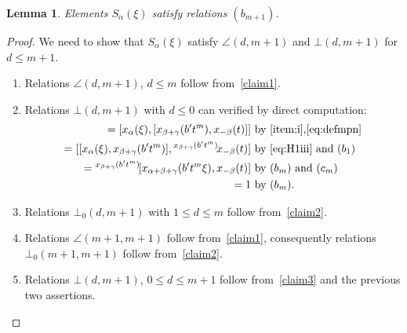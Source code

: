 \documentclass[oneside, 10pt]{amsart}
\newcommand{\rA}{\mathsf{A}}
\numberwithin{equation}{section}
\newtheorem{lemma}{Lemma}
\numberwithin{lemma}{section}
\theoremstyle{definition}
\theoremstyle{remark}
\begin{document}
\begin{lemma}
Elements $S_\alpha(\xi)$ satisfy relations $(b_{m+1})$.
 \end{lemma}
\begin{proof}
We need to show that $S_\alpha(\xi)$ satisfy $\angle(d, m+1)$ and $\bot(d, m+1)$ for $d\leq m+1$.
\begin{enumerate}
 \item Relations $\angle(d, m+1)$, $d\leq m$ follow from~\cref{claim1}. 
 \item Relations $\bot(d, m+1)$ with $d\leq 0$ can verified by direct computation:
 \begin{align*} 
 [x_\alpha(\xi), S_{\gamma}(bt^{m+1})] = [x_\alpha(\xi), [x_{\beta+\gamma}(b't^m), x_{-\beta}(t)]] & \text{ by~\eqref{item:i},\eqref{eq:defmpn}} \\
 = [[x_\alpha(\xi), x_{\beta+\gamma}(b't^m)], {}^{x_{\beta+\gamma}(b't^m)}\!x_{-\beta}(t)] &
 \text{ by \eqref{eq:H1iii} and $(b_1)$} \\
 = {}^{x_{\beta+\gamma}(b't^m)}\![x_{\alpha+\beta+\gamma}(b't^m\xi), x_{-\beta}(t)] &
 \text{ by $(b_m)$ and $(c_m)$} \\
 = 1 & \text{ by $(b_m)$.}
\end{align*}
 \item Relations $\bot_0(d, m+1)$ with $1\leq d\leq m$ follow from~\cref{claim2}.
 \item Relations $\angle(m+1, m+1)$ follow from~\cref{claim1}, consequently relations $\bot_0(m+1, m+1)$ follow from~\cref{claim2}.
 \item Relations $\bot(d, m+1)$, $0\leq d\leq m+1$ follow from~\cref{claim3} and the previous two assertions.
\end{enumerate}
\begin{comment}
 \begin{enumerate}
\item \label{case:1} First consider the case $d \leq 0$. There are two further subcases.
 \begin{enumerate}
  \item \label{case:1a} Case $\alpha \not \perp \alpha'$. 
  Without loss of generality we may assume that $\alpha' = \alpha + \beta$
  for some $\rA_3$-triple $(\alpha, \beta, \gamma)$.
  Using~\eqref{eq:H1iii} and~\eqref{eq:bm} we obtain
   \begin{multline} \nonumber
   [S_\alpha(\xi), S_{\alpha+\beta}(bt^{m+1})] = [x_\alpha(\xi), [x_{\alpha+\beta+\gamma}(b't^m), x_{-\gamma}(t)]] = \\   
  = [[x_\alpha(\xi), x_{\alpha+\beta+\gamma}(b't^m)], {}^{x_{\alpha+\beta+\gamma}(b't^m)}\!x_{-\gamma}(t)] = 1 \text{ for some $b'\in A$ }.

\end{comment}
\end{proof}
\end{document}
